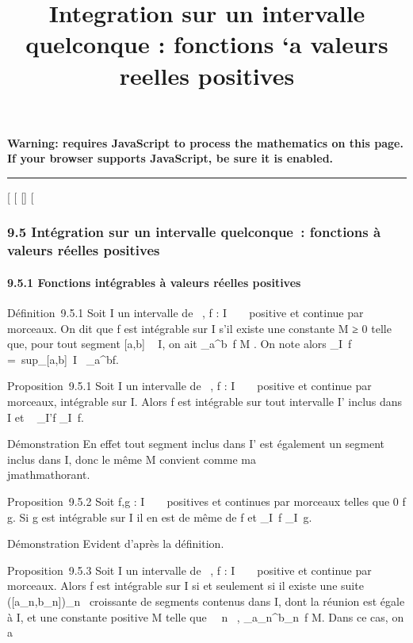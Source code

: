 \documentclass[]{article}
\title{Integration sur un intervalle quelconque : fonctions `a valeurs reelles
positives}
\author{}
\date{}
\begin{document}
\maketitle

\textbf{Warning: 
requires JavaScript to process the mathematics on this page.\\ If your
browser supports JavaScript, be sure it is enabled.}

\begin{center}\rule{3in}{0.4pt}\end{center}

{[}
{[}
{[}{]}
{[}

\subsubsection{9.5 Intégration sur un intervalle quelconque~: fonctions
à valeurs réelles positives}

\paragraph{9.5.1 Fonctions intégrables à valeurs réelles positives}

Définition~9.5.1 Soit I un intervalle de ~, f : I \rightarrow~ ~ positive et
continue par morceaux. On dit que f est intégrable sur I s'il existe une
constante M ≥ 0 telle que, pour tout segment {[}a,b{]} \subset~ I, on ait
\int  _a^b~f \leq M . On note alors
\int  _I~f =\
sup_{[}a,b{]}\subset~I\int ~
_a^bf.

Proposition~9.5.1 Soit I un intervalle de ~, f : I \rightarrow~ ~ positive et
continue par morceaux, intégrable sur I. Alors f est intégrable sur tout
intervalle I' inclus dans I et \int ~
_I'f \leq\int  _I~f.

Démonstration En effet tout segment inclus dans I' est également un
segment inclus dans I, donc le même M convient comme ma\\jmathmathorant.

Proposition~9.5.2 Soit f,g : I \rightarrow~ ~ positives et continues par morceaux
telles que 0 \leq f \leq g. Si g est intégrable sur I il en est de même de f
et \int  _I~f
\leq\int  _I~g.

Démonstration Evident d'après la définition.

Proposition~9.5.3 Soit I un intervalle de ~, f : I \rightarrow~ ~ positive et
continue par morceaux. Alors f est intégrable sur I si et seulement si
il existe une suite ({[}a_n,b_n{]})_n\in\mathbb{N}~
croissante de segments contenus dans I, dont la réunion est égale à I,
et une constante positive M telle que \forall~~n \in \mathbb{N}~,
\int  _a_n^b_n~f
\leq M. Dans ce cas, on a
\end{document}
